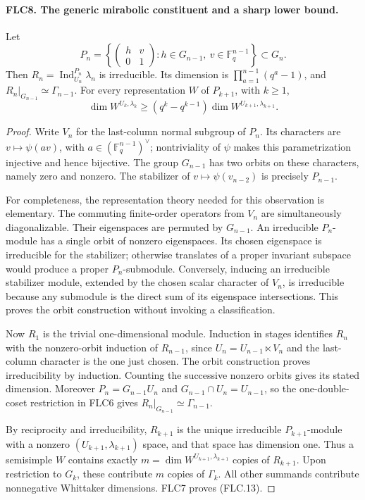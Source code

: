 \paragraph{FLC8. The generic mirabolic constituent and a sharp lower bound.}
\label{claim:FLC8}
Let
\[
 P_n=\left\{\begin{pmatrix}h&v\\0&1\end{pmatrix}:
              h\in G_{n-1},\ v\in\mathbb F_q^{n-1}\right\}
               \subset G_n.
\]
Then $R_n=\operatorname{Ind}_{U_n}^{P_n}\lambda_n$ is
irreducible.  Its dimension is
$\prod_{a=1}^{n-1}(q^a-1)$, and
$R_n|_{G_{n-1}}\simeq\Gamma_{n-1}$.
For every representation $W$ of $P_{k+1}$, with $k\ge1$,
\[
 \dim W^{U_k,\lambda_k}\ge
          (q^k-q^{k-1})\dim W^{U_{k+1},\lambda_{k+1}}.
 \tag{FLC.13}
\]
\begin{proof}
Write $V_n$ for the last-column normal subgroup of $P_n$.
Its characters are $v\mapsto\psi(av)$, with
$a\in(\mathbb F_q^{n-1})^\vee$; nontriviality of $\psi$
makes this parametrization injective and hence bijective.
The group $G_{n-1}$ has two orbits on these characters,
namely zero and nonzero.  The stabilizer of
$v\mapsto\psi(v_{n-2})$ is precisely $P_{n-1}$.

For completeness, the representation theory needed for this
observation is elementary.  The commuting finite-order
operators from $V_n$ are simultaneously diagonalizable.
Their eigenspaces are permuted by $G_{n-1}$.  An irreducible
$P_n$-module has a single orbit of nonzero eigenspaces.
Its chosen eigenspace is irreducible for the stabilizer;
otherwise translates of a proper invariant subspace would
produce a proper $P_n$-submodule.  Conversely, inducing an
irreducible stabilizer module, extended by the chosen scalar
character of $V_n$, is irreducible because any submodule is
the direct sum of its eigenspace intersections.  This proves
the orbit construction without invoking a classification.

Now $R_1$ is the trivial one-dimensional module.  Induction
in stages identifies $R_n$ with the nonzero-orbit induction
of $R_{n-1}$, since
$U_n=U_{n-1}\ltimes V_n$ and the last-column character is the
one just chosen.  The orbit construction proves irreducibility
by induction.  Counting the successive nonzero orbits gives
its stated dimension.  Moreover $P_n=G_{n-1}U_n$ and
$G_{n-1}\cap U_n=U_{n-1}$, so the one-double-coset restriction
in FLC6 gives $R_n|_{G_{n-1}}\simeq\Gamma_{n-1}$.

By reciprocity and irreducibility, $R_{k+1}$ is the unique
irreducible $P_{k+1}$-module with a nonzero
$(U_{k+1},\lambda_{k+1})$ space, and that space has dimension
one.  Thus a semisimple $W$ contains exactly
$m=\dim W^{U_{k+1},\lambda_{k+1}}$ copies of $R_{k+1}$.
Upon restriction to $G_k$, these contribute $m$ copies of
$\Gamma_k$.  All other summands contribute nonnegative
Whittaker dimensions.  FLC7 proves (FLC.13).
\end{proof}

